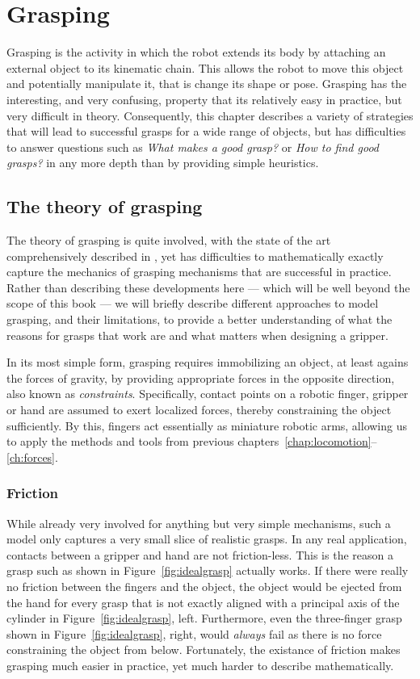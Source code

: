 \chapter{Grasping}\label{chap:grasping}
Grasping is the activity in which the robot extends its body by attaching an external object to its kinematic chain. This allows the robot to move this object and potentially manipulate it, that is change its shape or pose. Grasping has the interesting, and very confusing, property that its relatively easy in practice, but very difficult in theory. Consequently, this chapter describes a variety of strategies that will lead to successful grasps for a wide range of objects, but has difficulties to answer questions such as \emph{What makes a good grasp?} or \emph{How to find good grasps?} in any more depth than by providing simple heuristics.

\section{The theory of grasping}
The theory of grasping is quite involved, with the state of the art comprehensively described in \cite{rimon2019mechanics}, yet has difficulties to mathematically exactly capture the mechanics of grasping mechanisms that are successful in practice. Rather than describing these developments here --- which will be well beyond the scope of this book --- we will briefly describe different approaches to model grasping, and their limitations, to provide a better understanding of what the reasons for grasps that work are and what matters when designing a gripper.


In its most simple form, grasping requires immobilizing an object, at least agains the forces of gravity, by providing appropriate forces in the opposite direction, also known as \emph{constraints}. Specifically, contact points on a robotic finger, gripper or hand are assumed to exert localized forces, thereby constraining the object sufficiently. By this, fingers act essentially as miniature robotic arms, allowing us to apply the methods and tools from previous chapters~\ref{chap:locomotion}--\ref{ch:forces}.

\subsection{Friction}\label{sec:grasping_friction}
While already very involved for anything but very simple mechanisms, such a model only captures a very small slice of realistic grasps. In any real application, contacts between a gripper and hand are not friction-less. This is the reason a grasp such as shown in Figure~\ref{fig:idealgrasp} actually works. If there were really no friction between the fingers and the object, the object would be ejected from the hand for every grasp that is not exactly aligned with a principal axis of the cylinder in Figure~\ref{fig:idealgrasp}, left. Furthermore, even the three-finger grasp shown in  Figure~\ref{fig:idealgrasp}, right, would \emph{always} fail as there is no force constraining the object from below. Fortunately, the existance of friction makes grasping much easier in practice, yet much harder to describe mathematically.

